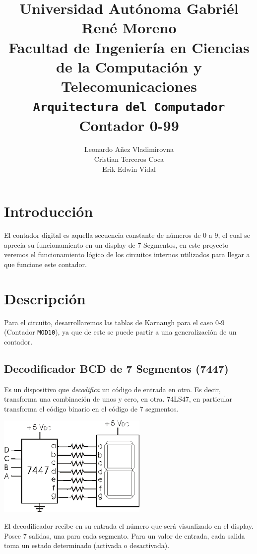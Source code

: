 \documentclass[10pt,letterpaper]{article}
\author{
Leonardo Añez Vladimirovna\\
Cristian Terceros Coca\\
Erik Edwin Vidal
}
\title{
Universidad Autónoma Gabriél René Moreno \\
Facultad de Ingeniería en Ciencias de la  Computación y Telecomunicaciones \\\vspace{1cm}
\texttt{Arquitectura del Computador} \\\vspace{3cm}
Contador 0-99\\\vspace{2cm}}
\begin{document}
\maketitle

\pagebreak

\section*{Introducción}
El contador digital es aquella secuencia constante de números de 0 a 9, el cual se aprecia su funcionamiento en un display de 7 Segmentos, en este proyecto veremos el
funcionamiento lógico de los circuitos internos utilizados para llegar a que funcione este contador.
\section{Descripción}
Para el circuito, desarrollaremos las tablas de Karnaugh para el caso 0-9 (Contador \texttt{MOD10}), ya que de este se puede partir a una generalización de un contador.
\subsection{Decodificador BCD de 7 Segmentos (7447)}
Es un dispositivo que \textit{decodifica} un código de entrada en otro. Es decir, transforma una combinación de unos y cero, en otra. 74LS47, en particular transforma el código binario en el código de 7 segmentos.
\begin{center}
\includegraphics[scale=0.5]{7447}
\end{center}
El decodificador recibe en su entrada el número que será visualizado en el display. Posee 7 salidas, una para cada segmento. Para un valor de entrada, cada salida toma un estado determinado (activada o desactivada).
\end{document}
